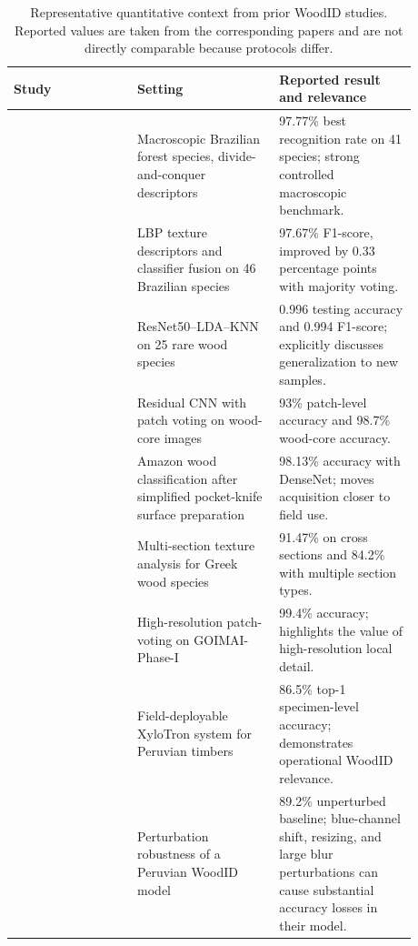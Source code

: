 \documentclass[a4paper,fleqn]{els-cas-templates/cas-sc}
\begin{document}
\begin{table}[pos=htbp]
\centering
\caption{Representative quantitative context from prior WoodID studies. Reported values are taken from the corresponding papers and are not directly comparable because protocols differ.}
\label{tab:related_quant}
\footnotesize
\begin{tabular}{p{0.27\linewidth}p{0.31\linewidth}p{0.30\linewidth}}
\toprule
Study & Setting & Reported result and relevance \\
\midrule
\citet{paulafilho2014forest} & Macroscopic Brazilian forest species, divide-and-conquer descriptors & 97.77\% best recognition rate on 41 species; strong controlled macroscopic benchmark. \\
\citet{souza2020brazilian} & LBP texture descriptors and classifier fusion on 46 Brazilian species & 97.67\% F1-score, improved by 0.33 percentage points with majority voting. \\
\citet{sun2021smallwood} & ResNet50--LDA--KNN on 25 rare wood species & 0.996 testing accuracy and 0.994 F1-score; explicitly discusses generalization to new samples. \\
\citet{fabijanska2021woodcore} & Residual CNN with patch voting on wood-core images & 93\% patch-level accuracy and 98.7\% wood-core accuracy. \\
\citet{degeus2021amazon} & Amazon wood classification after simplified pocket-knife surface preparation & 98.13\% accuracy with DenseNet; moves acquisition closer to field use. \\
\citet{barmpoutis2018woodauth} & Multi-section texture analysis for Greek wood species & 91.47\% on cross sections and 84.2\% with multiple section types. \\
\citet{herrera2026goimai} & High-resolution patch-voting on GOIMAI-Phase-I & 99.4\% accuracy; highlights the value of high-resolution local detail. \\
\citet{ravindran2021field} & Field-deployable XyloTron system for Peruvian timbers & 86.5\% top-1 specimen-level accuracy; demonstrates operational WoodID relevance. \\
\citet{owens2025robustness} & Perturbation robustness of a Peruvian WoodID model & 89.2\% unperturbed baseline; blue-channel shift, resizing, and large blur perturbations can cause substantial accuracy losses in their model. \\
\bottomrule
\end{tabular}
\end{table}
\end{document}
